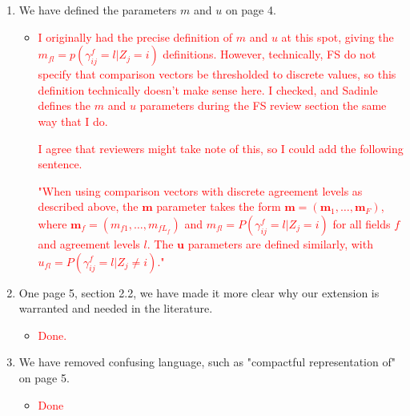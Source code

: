 \documentclass[letterpaper, parskip]{scrartcl}
\begin{document}
\begin{enumerate}
%

\item We have defined the parameters $m$ and $u$ on page 4. 
\begin{itemize}
	\item \textcolor{red}{I originally had the precise definition of $m$ and $u$ at this spot, giving the $m_{fl} = p(\gamma_{ij}^f = l | Z_{j} = i)$ definitions. However, technically, FS do not specify that comparison vectors be thresholded to discrete values, so this definition technically doesn't make sense here. I checked, and Sadinle defines the $m$ and $u$ parameters during the FS review section the same way that I do.}
	
	\textcolor{red}{I agree that reviewers might take note of this, so I could add the following sentence.}
	
	\textcolor{red}{"When using comparison vectors with discrete agreement levels as described above, the $\bm{m}$ parameter takes the form $\bm{m} = (\bm{m}_1, \ldots, \bm{m}_F)$, where $\bm{m}_f = (m_{f1}, \ldots, m_{fL_f})$ and $m_{fl} = P(\gamma_{ij}^f = l|Z_j = i)$ for all fields $f$ and agreement levels $l$. The $\bm{u}$ parameters are defined similarly, with $u_{fl} = P(\gamma_{ij}^f = l|Z_j \neq i)$."}
\end{itemize}

\item One page 5, section 2.2, we have made it more clear why our extension is warranted and needed in the literature. 
\begin{itemize}
	\item \textcolor{red}{Done.}
\end{itemize}

\item We have removed confusing language, such as "compactful representation of" on page 5.
\begin{itemize}
	\item \textcolor{red}{Done}
\end{itemize}


\end{enumerate}
\end{document}
